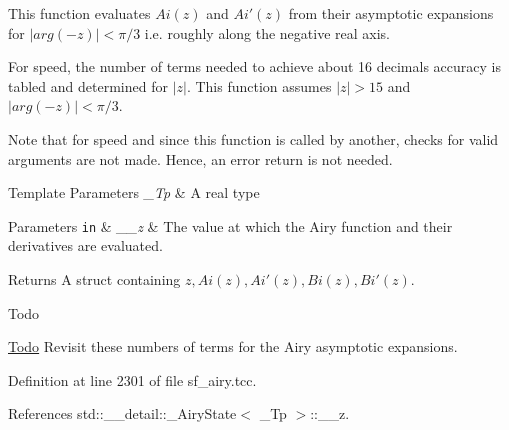 This function evaluates $ Ai(z) $ and $ Ai'(z) $ from their asymptotic expansions for $ |arg(-z)| < \pi/3 $ i.\+e. roughly along the negative real axis. 

For speed, the number of terms needed to achieve about 16 decimals accuracy is tabled and determined for $ |z| $. This function assumes $ |z| > 15 $ and $ |arg(-z)| < \pi/3 $.

Note that for speed and since this function is called by another, checks for valid arguments are not made. Hence, an error return is not needed.


\begin{DoxyTemplParams}{Template Parameters}
{\em \+\_\+\+Tp} & A real type \\
\hline
\end{DoxyTemplParams}

\begin{DoxyParams}[1]{Parameters}
\mbox{\tt in}  & {\em \+\_\+\+\_\+z} & The value at which the Airy function and their derivatives are evaluated. \\
\hline
\end{DoxyParams}
\begin{DoxyReturn}{Returns}
A struct containing $ z, Ai(z), Ai'(z), Bi(z), Bi'(z) $. 
\end{DoxyReturn}
\begin{DoxyRefDesc}{Todo}
\item[\hyperlink{todo__todo000003}{Todo}]Revisit these numbers of terms for the Airy asymptotic expansions. \end{DoxyRefDesc}


Definition at line 2301 of file sf\+\_\+airy.\+tcc.



References std\+::\+\_\+\+\_\+detail\+::\+\_\+\+Airy\+State$<$ \+\_\+\+Tp $>$\+::\+\_\+\+\_\+z.

\mbox{\label{classstd_1_1____detail_1_1__Airy__asymp_a79ba1c14d03fad8369477baf39c62874}} 
